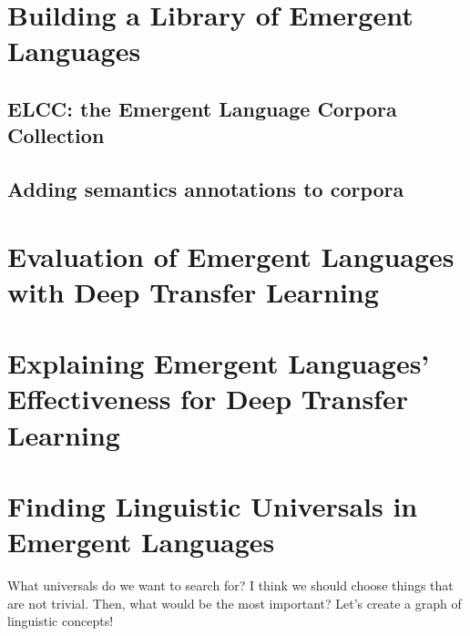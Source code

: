 \newpage
\tableofcontents*



\chapter{Building a Library of Emergent Languages}

\section{ELCC: the Emergent Language Corpora Collection }


\section{Adding semantics annotations to corpora }
\unskip\label{sec:rich-corpora}

\chapter{Evaluation of Emergent Languages with Deep Transfer Learning}



\chapter{Explaining Emergent Languages' Effectiveness for Deep Transfer Learning }
\unskip\label{ch:xferbench-analysis}



\chapter{Finding Linguistic Universals in Emergent Languages }
\unskip\label{ch:universals}

What universals do we want to search for?
I think we should choose things that are not trivial.
Then, what would be the most important?
Let's create a graph of linguistic concepts!

